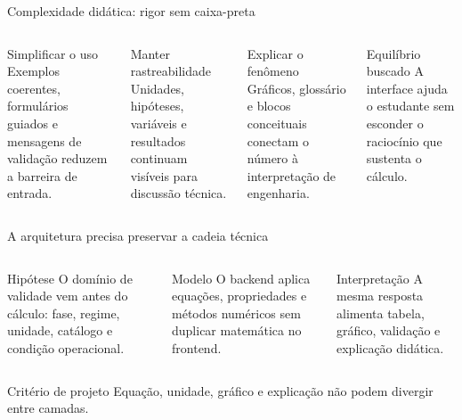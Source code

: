 \begin{frame}{Complexidade didática: rigor sem caixa-preta}
  \begin{columns}[T,onlytextwidth]
      \begin{block}{Simplificar o uso}
        Exemplos coerentes, formulários guiados e mensagens de validação reduzem a barreira de entrada.
      \end{block}
      \begin{block}{Manter rastreabilidade}
        Unidades, hipóteses, variáveis e resultados continuam visíveis para discussão técnica.
      \end{block}
      \begin{block}{Explicar o fenômeno}
        Gráficos, glossário e blocos conceituais conectam o número à interpretação de engenharia.
      \end{block}
      \begin{alertblock}{Equilíbrio buscado}
        A interface ajuda o estudante sem esconder o raciocínio que sustenta o cálculo.
      \end{alertblock}
  \end{columns}
\end{frame}

\begin{frame}{A arquitetura precisa preservar a cadeia técnica}
  \begin{columns}[T,onlytextwidth]
      \begin{block}{Hipótese}
        O domínio de validade vem antes do cálculo: fase, regime, unidade, catálogo e condição operacional.
      \end{block}
      \begin{block}{Modelo}
        O backend aplica equações, propriedades e métodos numéricos sem duplicar matemática no frontend.
      \end{block}
      \begin{block}{Interpretação}
        A mesma resposta alimenta tabela, gráfico, validação e explicação didática.
      \end{block}
  \end{columns}
  \vspace{0.55em}
  \begin{alertblock}{Critério de projeto}
    Equação, unidade, gráfico e explicação não podem divergir entre camadas.
  \end{alertblock}
\end{frame}

